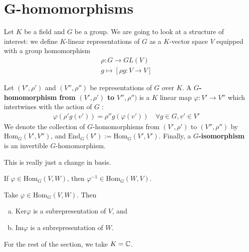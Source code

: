 \documentclass{memoir}
\begin{document}


\section{G-homomorphisms}
\label{sec:g_homomorphisms}

Let \(K\) be a field and \(G\) be a group. We are going to look at a structure of interest: we define \(K\)-linear representations of \(G\) as a \(K\)-vector space \(V\) equipped with a group homomorphism
\begin{align*}
	\rho:G\to GL(V)\\
	g\mapsto [\rho g:V\to V]
\end{align*}

\begin{defn}[\(G\)-homomorphism]
	Let \((V',\rho')\) and \((V'',\rho'')\) be representations of \(G\) over \(K\). A \textbf{\(G\)-homomorphism from \((V',\rho')\) to \(V'',\rho'')\)} is a \(K\) linear map \(\varphi:V'\to V''\) which intertwines with the action of \(G\) :
	\begin{align*}
		\varphi(\rho'g(v')) = \rho''g(\varphi(v')) \quad \forall g \in G, v' \in V'
	\end{align*}
	We denote the collection of \(G\)-homomorphisms from \((V', \rho')\) to \((V'', \rho'')\) by \( \textrm{Hom}_G(V',V'')\), and \(\textrm{End}_G(V') := \textrm{Hom}_G(V',V')\). Finally, a \textbf{\(G\)-isomorphism} is an invertible \(G\)-homomorphism.
\end{defn}

This is really just a change in basis.

\begin{prop}
	If \(\varphi \in \textrm{Hom}_G(V,W)\), then \(\varphi^{-1} \in \textrm{Hom}_G(W,V)\).
\end{prop}
\begin{prop} %
	Take \(\varphi \in \textrm{Hom}_G(V,W)\). Then
	\begin{enumerate}[(a).]
		\item \(\textrm{Ker}\varphi \) is a subrepresentation of \(V\), and
		\item \(\textrm{Im}\varphi\) is a subrepresentation of \(W\).
	\end{enumerate}
\end{prop}
For the rest of the section, we take \(K = \mathbb{C}\).
\end{document}
